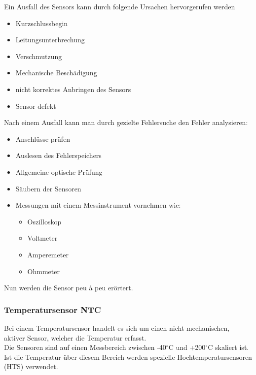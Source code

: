 				Ein Ausfall des Sensors kann durch folgende Ursachen hervorgerufen werden
				\begin{itemize}
					\item Kurzschlussbegin
					\item Leitungsunterbrechung
					\item Verschmutzung
					\item Mechanische Beschädigung
					\item nicht korrektes Anbringen des Sensors
					\item Sensor defekt
				\end{itemize}	
				
				Nach einem Ausfall kann man durch gezielte Fehlersuche den Fehler analysieren:
				\begin{itemize}
					\item Anschlüsse prüfen
					\item Auslesen des Fehlerspeichers
					\item Allgemeine optische Prüfung
					\item Säubern der Sensoren
					\item Messungen mit einem Messinstrument vornehmen wie:
					\begin{itemize}
						\item Oszilloskop 
						\item Voltmeter
						\item Amperemeter
						\item Ohmmeter	
					\end{itemize}
					
				\end{itemize}					

				Nun werden die Sensor peu à peu erörtert. 
		
			\subsubsection{Temperatursensor NTC}
			Bei einem Temperatursensor handelt es sich um einen nicht-mechanischen, aktiver	Sensor, welcher die Temperatur erfasst.\\
			Die Sensoren sind auf einen Messbereich zwischen -40$^\circ$C und +200$^\circ$C skaliert ist. Ist die Temperatur über diesem Bereich werden spezielle Hochtemperatursensoren (HTS) verwendet.

